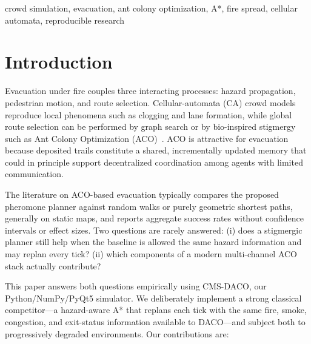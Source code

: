 \documentclass[conference]{IEEEtran}
\begin{document}
\begin{IEEEkeywords}
crowd simulation, evacuation, ant colony optimization, A*, fire spread, cellular automata, reproducible research
\end{IEEEkeywords}

\section{Introduction}
Evacuation under fire couples three interacting processes: hazard propagation, pedestrian motion, and route selection. Cellular-automata (CA) crowd models reproduce local phenomena such as clogging and lane formation, while global route selection can be performed by graph search or by bio-inspired stigmergy such as Ant Colony Optimization (ACO)~\cite{dorigo2004}. ACO is attractive for evacuation because deposited trails constitute a shared, incrementally updated memory that could in principle support decentralized coordination among agents with limited communication.

The literature on ACO-based evacuation typically compares the proposed pheromone planner against random walks or purely geometric shortest paths, generally on static maps, and reports aggregate success rates without confidence intervals or effect sizes. Two questions are rarely answered: (i) does a stigmergic planner still help when the baseline is allowed the same hazard information and may replan every tick? (ii) which components of a modern multi-channel ACO stack actually contribute?

This paper answers both questions empirically using CMS-DACO, our Python/NumPy/PyQt5 simulator. We deliberately implement a strong classical competitor---a hazard-aware A* that replans each tick with the same fire, smoke, congestion, and exit-status information available to DACO---and subject both to progressively degraded environments. Our contributions are:
\end{document}
